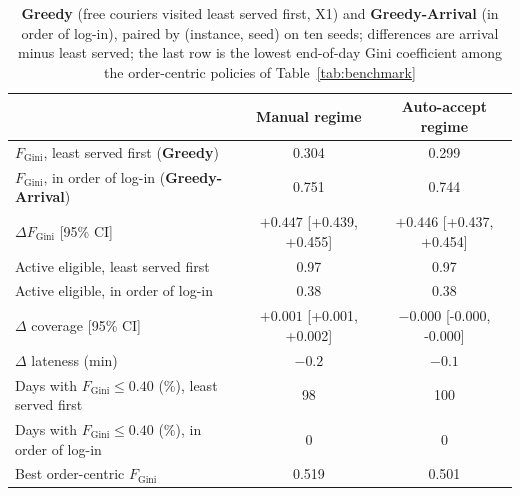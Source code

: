 \documentclass[a4paper,11pt,review,3p,authoryear]{elsarticle}
\newcommand{\FG}{F_{\text{Gini}}}
\begin{document}
\begin{table}[htbp]
\centering
\small
\begin{tabular}{l|cc}
\hline
 & \textbf{Manual regime} & \textbf{Auto-accept regime} \\
\hline
$\FG$, least served first (\textbf{Greedy}) & 0.304 & 0.299 \\
$\FG$, in order of log-in (\textbf{Greedy-Arrival}) & 0.751 & 0.744 \\
$\Delta \FG$ [95\% CI] & $+0.447$ [+0.439, +0.455] & $+0.446$ [+0.437, +0.454] \\
Active eligible, least served first & 0.97 & 0.97 \\
Active eligible, in order of log-in & 0.38 & 0.38 \\
$\Delta$ coverage [95\% CI] & $+0.001$ [+0.001, +0.002] & $-0.000$ [-0.000, -0.000] \\
$\Delta$ lateness (min) & $-0.2$ & $-0.1$ \\
Days with $\FG \le 0.40$ (\%), least served first & 98 & 100 \\
Days with $\FG \le 0.40$ (\%), in order of log-in & 0 & 0 \\
Best order-centric $\FG$ & 0.519 & 0.501 \\
\hline
\end{tabular}
\caption{\textbf{Greedy} (free couriers visited least served first, X1) and \textbf{Greedy-Arrival} (in order of log-in), paired by (instance, seed) on ten seeds; differences are arrival minus least served; the last row is the lowest end-of-day Gini coefficient among the order-centric policies of Table~\ref{tab:benchmark}}
\label{tab:review_arrival}
\end{table}
\end{document}
